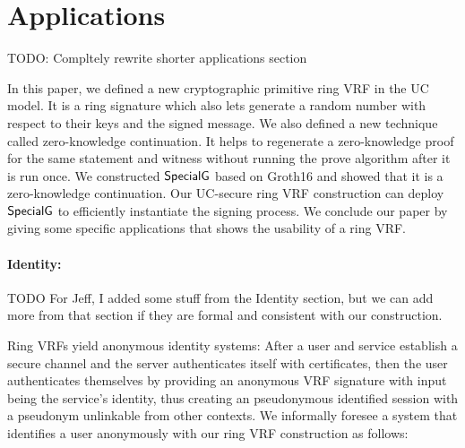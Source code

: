 
\section{Applications}
\label{sec:applicaitons_short}

TODO: Compltely rewrite shorter applications section


In this paper,  we defined a new cryptographic primitive ring VRF in the UC model. It is a ring signature which also lets generate a random number with respect to their keys and the signed message. We  also defined a new technique called zero-knowledge continuation. It helps to regenerate a zero-knowledge proof for the same statement and witness without running the prove algorithm after it is run once. We constructed  $ {\mathsf{SpecialG}} $ based on Groth16 \cite{Groth16} and showed that it is a zero-knowledge continuation. Our UC-secure ring VRF construction can deploy $ {\mathsf{SpecialG}} $ to efficiently instantiate the signing process. 
We conclude our paper by giving some specific applications that shows the usability of a ring VRF.

\paragraph{Identity:} 
TODO For Jeff, I added some stuff from the Identity section, but we can add more from that section if they are formal and consistent with our construction.

 Ring VRFs yield anonymous identity systems:
After a user and service establish a secure channel and
the server authenticates itself with certificates, then
the user authenticates themselves by providing an anonymous
VRF signature with input \msg being the service's identity,
thus creating an pseudonymous identified session with
a pseudonym unlinkable from other contexts. We informally foresee a system that identifies a user anonymously with our ring VRF construction as follows:


